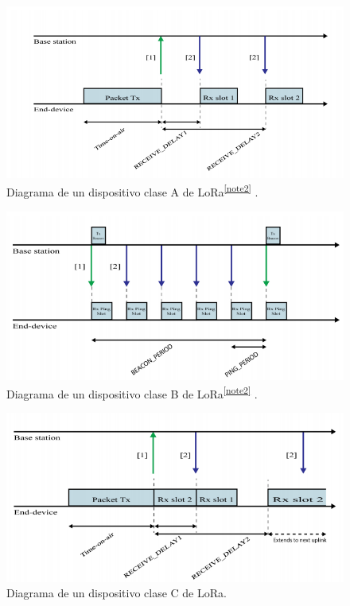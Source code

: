 \begin{figure}[H]
	\centering
	\includegraphics[scale=.65]{./Figures/LoraclassA.PNG}
	\caption{Diagrama de un dispositivo clase A de LoRa\textsuperscript{\ref{note2}} \citep{Ruano2016}.}
	\label{fig:LoraclassA}
\end{figure}

\begin{figure}[H]
	\centering
	\includegraphics[scale=.75]{./Figures/LoraClaseB.PNG}
	\caption{Diagrama de un dispositivo clase B de LoRa\textsuperscript{\ref{note2}} \citep{Ruano2016}.}
	\label{fig:LoraClaseB}
\end{figure}


\begin{figure}[H]
	\centering
	\includegraphics[scale=.65]{./Figures/LoraClaseC.PNG}
	\caption{Diagrama de un dispositivo clase C de LoRa\protect\footnotemark \citep{Ruano2016}.} %
	\label{fig:LoraClaseC}
\end{figure}


